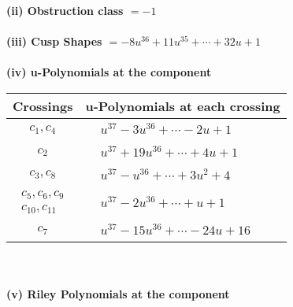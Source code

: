 \documentclass[1p]{elsarticle_modified}
\theoremstyle{definition}
\begin{document}
\flushleft \textbf{(ii) Obstruction class $= -1$}\\~\\
\flushleft \textbf{(iii) Cusp Shapes $= -8 u^{36}+11 u^{35}+\cdots+32 u+1$}\\~\\
\newpage\renewcommand{\arraystretch}{1}
\flushleft \textbf{(iv) u-Polynomials at the component}\newline \\
\begin{tabular}{m{50pt}|m{274pt}}
Crossings & \hspace{64pt}u-Polynomials at each crossing \\
\hline $$\begin{aligned}c_{1},c_{4}\end{aligned}$$&$\begin{aligned}
&u^{37}-3 u^{36}+\cdots-2 u+1
\end{aligned}$\\
\hline $$\begin{aligned}c_{2}\end{aligned}$$&$\begin{aligned}
&u^{37}+19 u^{36}+\cdots+4 u+1
\end{aligned}$\\
\hline $$\begin{aligned}c_{3},c_{8}\end{aligned}$$&$\begin{aligned}
&u^{37}- u^{36}+\cdots+3 u^2+4
\end{aligned}$\\
\hline $$\begin{aligned}c_{5},c_{6},c_{9}\\c_{10},c_{11}\end{aligned}$$&$\begin{aligned}
&u^{37}-2 u^{36}+\cdots+u+1
\end{aligned}$\\
\hline $$\begin{aligned}c_{7}\end{aligned}$$&$\begin{aligned}
&u^{37}-15 u^{36}+\cdots-24 u+16
\end{aligned}$\\
\hline
\end{tabular}\\~\\
\newpage\renewcommand{\arraystretch}{1}
\flushleft \textbf{(v) Riley Polynomials at the component}\newline \\
\end{document}
